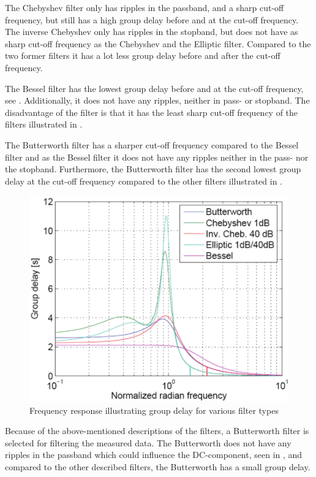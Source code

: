 The Chebyshev filter only has ripples in the passband, and a sharp cut-off frequency, but still has a high group delay before and at the cut-off frequency. The inverse Chebyshev only has ripples in the stopband, but does not have as sharp cut-off frequency as the Chebyshev and the Elliptic filter. Compared to the two former filters it has a lot less group delay before and after the cut-off frequency.

The Bessel filter has the lowest group delay before and at the cut-off frequency, see . Additionally, it does not have any ripples, neither in pass- or stopband. The disadvantage of the filter is that it has the least sharp cut-off frequency of the filters illustrated in .

The Butterworth filter has a sharper cut-off frequency compared to the Bessel filter and as the Bessel filter it does not have any ripples neither in the pass- nor the stopband. Furthermore, the Butterworth filter has the second lowest group delay at the cut-off frequency compared to the other filters illustrated in . 

\begin{figure}[H]
	\centering
	\includegraphics[scale=0.7]{figures/Filtertypes2.pdf}
	\caption{Frequency response illustrating group delay for various filter types}
	\label{fig:groupdelay}
\end{figure}\vspace{-5mm}

Because of the above-mentioned descriptions of the filters, a Butterworth filter is selected for filtering the measured data. The Butterworth does not have any ripples in the passband which could influence the DC-component, seen in , and compared to the other described filters, the Butterworth has a small group delay.

